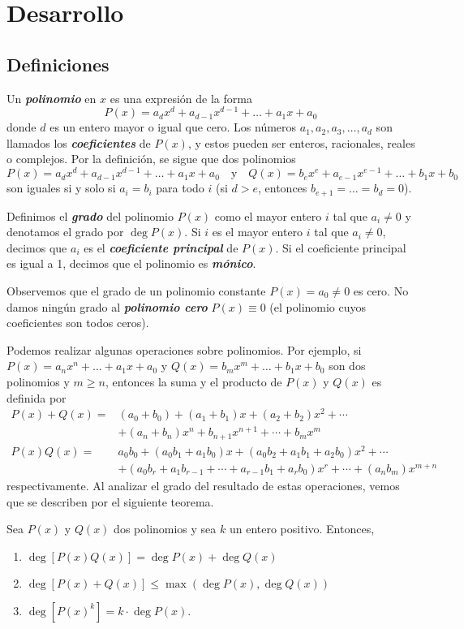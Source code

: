 \section{Desarrollo}

\subsection{Definiciones}

Un \textbf{\emph{polinomio}} en $x$ es una expresión de la forma
\[
    P(x) = a_d x^d + a_{d - 1} x^{d - 1} + \ldots + a_1 x + a_0
\]
donde $d$ es un entero mayor o igual que cero.
Los números $a_1, a_2, a_3, \dots, a_d$ son llamados los \textbf{\emph{coeficientes}} de $P(x)$, y estos pueden ser enteros, racionales, reales o complejos.
Por la definición, se sigue que dos polinomios
\[
    P(x) = a_d x^d + a_{d - 1} x^{d - 1} + \ldots + a_1 x + a_0 \quad \text{y} \quad Q(x) = b_e x^e + a_{e - 1} x^{e - 1} + \ldots + b_1 x + b_0
\]
son iguales si y solo si $a_i = b_i$ para todo $i$ (si $d > e$, entonces $b_{e + 1} = \ldots = b_d = 0$).

Definimos el \textbf{\emph{grado}} del polinomio $P(x)$ como el mayor entero $i$ tal que $a_i \neq 0$ y denotamos el grado por $\deg P(x)$.
Si $i$ es el mayor entero $i$ tal que $a_i \neq 0$, decimos que $a_i$ es el \textbf{\emph{coeficiente principal}} de $P(x)$.
Si el coeficiente principal es igual a 1, decimos que el polinomio es \textbf{\emph{mónico}}.

Observemos que el grado de un polinomio constante $P(x) = a_0 \neq 0$ es cero.
No damos ningún grado al \textbf{\emph{polinomio cero}} $P(x) \equiv 0$ (\ie el polinomio cuyos coeficientes son todos ceros).

Podemos realizar algunas operaciones sobre polinomios.
Por ejemplo, si $P(x) = a_n x^n + \ldots + a_1 x + a_0$ y $Q(x) = b_m x^m + \ldots + b_1 x + b_0$ son dos polinomios y $m \geq n$, entonces la suma y el producto de $P(x)$ y $Q(x)$ es definida por
\begin{align*}
    P(x) + Q(x) =& (a_0  + b_0) + (a_1 + b_1)x + (a_2 + b_2)x^2 + \cdots\\
    &+ (a_n + b_n)x^n + b_{n + 1} x^{n + 1} + \cdots + b_m x^m\\[2mm]
    P(x)Q(x) =& a_0 b_0 + (a_0 b_1 + a_1 b_0)x + (a_0 b_2 + a_1 b_1 + a_2 b_0)x^2 + \cdots \\
    &+ (a_0 b_r + a_1 b_{r - 1} + \cdots + a_{r - 1}b_1 + a_r b_0)x^r + \cdots + (a_n b_m)x^{m + n}
\end{align*}
respectivamente.
Al analizar el grado del resultado de estas operaciones, vemos que se describen por el siguiente teorema.
\begin{theorem.tcb}{}{}
    Sea $P(x)$ y $Q(x)$ dos polinomios y sea $k$ un entero positivo.
    Entonces,
    \begin{enumerate}
        \item $\deg [P(x) Q(x)] = \deg P(x) + \deg Q(x)$
        \item $\deg [P(x) + Q(x)] \leq \max (\deg P(x), \deg Q(x))$
        \item $\deg [P(x)^k] = k \cdot \deg P(x)$.
    \end{enumerate}
\end{theorem.tcb}

